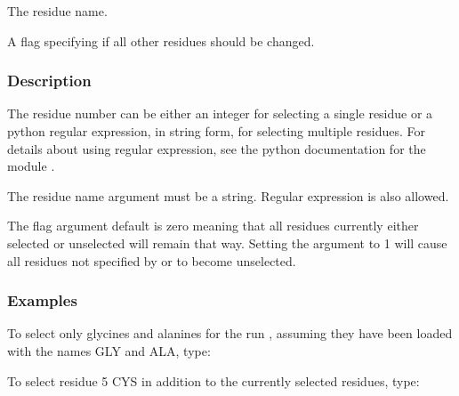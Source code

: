   The residue name. 

  A flag specifying if all other residues should be changed. 




\subsubsection{Description}

The residue number can be either an integer for selecting a single residue or a python regular expression, in string form, for selecting multiple residues.  For details about using regular expression, see the python documentation for the module .


The residue name argument must be a string.  Regular expression is also allowed.


The  flag argument default is zero meaning that all residues currently either selected or unselected will remain that way.  Setting the argument to 1 will cause all residues not specified by  or  to become unselected.



\subsubsection{Examples}

To select only glycines and alanines for the run , assuming they have been loaded with the names GLY and ALA, type:




To select residue 5 CYS in addition to the currently selected residues, type:









\newpage

